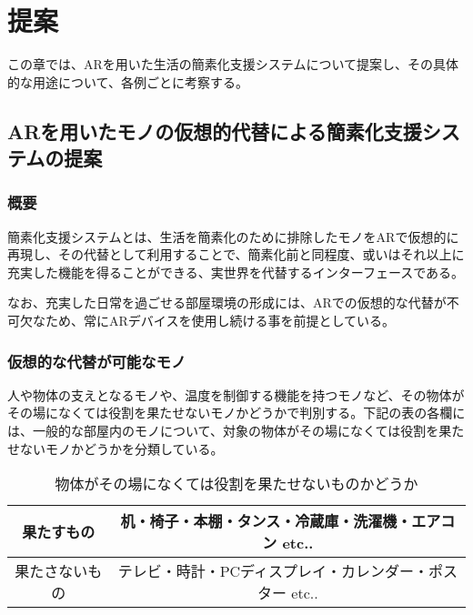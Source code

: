 
\chapter{提案}
\label{chap:suggestion}

この章では、ARを用いた生活の簡素化支援システムについて提案し、その具体的な用途について、各例ごとに考察する。

\newpage

\section{ARを用いたモノの仮想的代替による簡素化支援システムの提案}
\label{chap:suggestionDetail}

\subsection{概要}

簡素化支援システムとは、生活を簡素化のために排除したモノをARで仮想的に再現し、その代替として利用することで、簡素化前と同程度、或いはそれ以上に充実した機能を得ることができる、実世界を代替するインターフェースである。

なお、充実した日常を過ごせる部屋環境の形成には、ARでの仮想的な代替が不可欠なため、常にARデバイスを使用し続ける事を前提としている。

\subsection{仮想的な代替が可能なモノ}

人や物体の支えとなるモノや、温度を制御する機能を持つモノなど、その物体がその場になくては役割を果たせないモノかどうかで判別する。下記の表の各欄には、一般的な部屋内のモノについて、対象の物体がその場になくては役割を果たせないモノかどうかを分類している。

\begin{table}[htbp]
    \caption{物体がその場になくては役割を果たせないものかどうか}
    \label{tb:mono}
    \begin{center}\begin{tabular}{c|c}
      \hline
      果たすもの&机・椅子・本棚・タンス・冷蔵庫・洗濯機・エアコン etc..\\\hline
      果たさないもの&テレビ・時計・PCディスプレイ・カレンダー・ポスター etc..\\\hline
    \end{tabular}\end{center}
\end{table}

